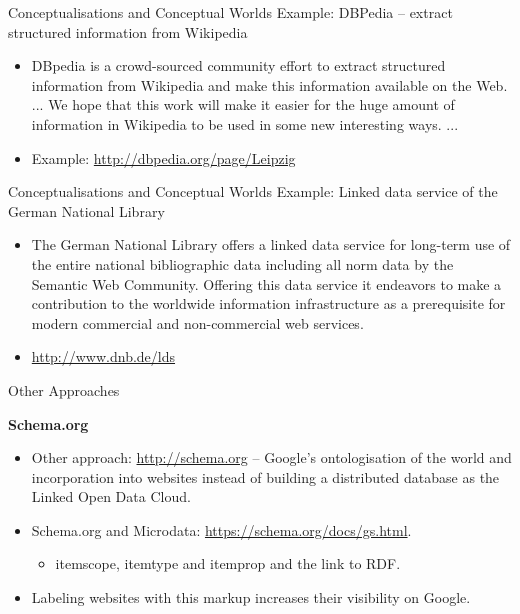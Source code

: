 \documentclass{beamer}
\newcommand{\ueberschrift}[1]{\begin{center}\bf #1\end{center}}
\begin{document}
\begin{frame}{Conceptualisations and Conceptual Worlds}
Example: DBPedia -- extract structured information from Wikipedia
\begin{itemize}
\item DBpedia is a crowd-sourced community effort to extract structured
  information from Wikipedia and make this information available on the
  Web. ... We hope that this work will make it easier for the huge amount of
  information in Wikipedia to be used in some new interesting ways. ...
\item Example: \url{http://dbpedia.org/page/Leipzig}
\end{itemize}
\end{frame}

\begin{frame}{Conceptualisations and Conceptual Worlds}
Example: Linked data service of the German National Library
\begin{itemize}
\item The German National Library offers a linked data service for long-term
  use of the entire national bibliographic data including all norm data by the
  Semantic Web Community. Offering this data service it endeavors to make a
  contribution to the worldwide information infrastructure as a prerequisite
  for modern commercial and non-commercial web services.
\item \url{http://www.dnb.de/lds}
\end{itemize}
\end{frame}

\begin{frame}{Other Approaches}
\ueberschrift{Schema.org}
\begin{itemize}
\item Other approach: \url{http://schema.org} -- Google's ontologisation of
  the world and incorporation into websites instead of building a distributed
  database as the Linked Open Data Cloud.
\item Schema.org and Microdata: \url{https://schema.org/docs/gs.html}.
  \begin{itemize}
  \item itemscope, itemtype and itemprop and the link to RDF.
  \end{itemize}
\item Labeling websites with this markup increases their visibility on Google.
\end{itemize}
\end{frame}
\end{document}
